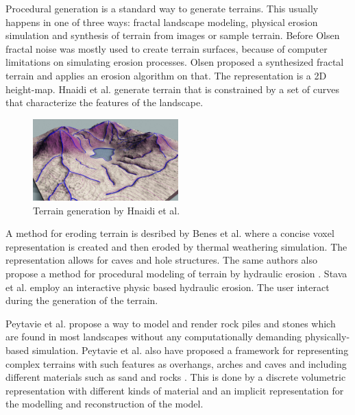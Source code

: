 \documentclass[a4paper,12pt]{report}
\begin{document}
 Procedural generation is a standard way to generate terrains. This usually happens in one of three ways: fractal landscape modeling, physical erosion simulation and synthesis of terrain from images or sample terrain. Before Olsen \cite{olsen2004realtime} fractal noise was mostly used to create terrain surfaces, because of computer limitations on simulating erosion processes. Olsen proposed a synthesized fractal terrain and applies an erosion algorithm on that. The representation is a 2D height-map. Hnaidi et al. \cite{hnaidi2010feature} generate terrain that is constrained by a set of curves that characterize the features of the landscape.
 
 
\begin{figure}
 \centering
 \includegraphics[width=0.5\textwidth]{thesis/related/hnaidi.png}
 \caption{Terrain generation by Hnaidi et al. }
 \label{fig:hnaidi}
\end{figure}

 
 A method for eroding terrain is desribed by Benes et al. \cite{benes2001layered} where a concise voxel representation is created and then eroded by thermal weathering simulation. The representation allows for caves and hole structures. The same authors also propose a method for procedural modeling of terrain by hydraulic erosion \cite{benevs2002visual}. Stava et al. \cite{vst2008interactive} employ an interactive physic based hydraulic erosion. The user interact during the generation of the terrain.
 
 Peytavie et al. \cite{peytavie2009procedural} propose a way to model and render rock piles and stones which are found in most landscapes without any computationally demanding physically-based simulation. Peytavie et al. also have proposed a framework for representing complex terrains with such features as overhangs, arches and caves and including different materials such as sand and rocks \cite{peytavie2009arches}. This is done by a discrete volumetric representation with different kinds of material and an implicit representation for the modelling and reconstruction of the model.
\end{document}
